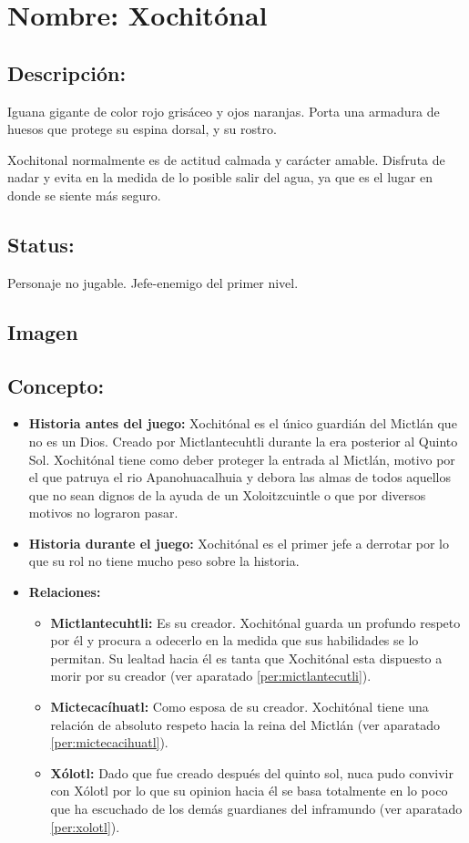 \section{Nombre: Xochitónal}  \label{per:xochitonal}

\subsection{Descripción:}
Iguana gigante de color rojo grisáceo y ojos naranjas. Porta una armadura de huesos que protege su espina dorsal, y su rostro.
\\
\par
Xochitonal normalmente es de actitud calmada y carácter amable. Disfruta de nadar y evita en la medida de lo posible salir del agua, ya que es el lugar en donde se siente más seguro.  
\subsection{Status:}
Personaje no jugable.
Jefe-enemigo del primer nivel.
\subsection{Imagen}
\subsection{Concepto:}
\begin{itemize}
	\item \textbf{Historia antes del juego:}
	Xochitónal es el único guardián del Mictlán que no es un Dios. Creado por Mictlantecuhtli durante la era posterior al Quinto Sol. Xochitónal tiene como deber proteger la entrada al Mictlán, motivo por el que patruya el rio Apanohuacalhuia y debora las almas de todos aquellos que no sean dignos de la ayuda de un Xoloitzcuintle o que por diversos motivos no lograron pasar.
	\item \textbf{Historia durante el juego:}
	Xochitónal es el primer jefe a derrotar por lo que su rol no tiene mucho peso sobre la historia.
	\item \textbf{Relaciones:}
	\begin{itemize}
		\item \textbf{Mictlantecuhtli:} Es su creador. Xochitónal guarda un profundo respeto por él y procura a odecerlo en la medida que sus habilidades se lo permitan. Su lealtad hacia él es tanta que Xochitónal esta dispuesto a morir por su creador (ver aparatado \ref{per:mictlantecutli}). 
		\item \textbf{Mictecacíhuatl:} Como esposa de su creador. Xochitónal tiene una relación de absoluto respeto hacia la reina del Mictlán (ver aparatado \ref{per:mictecacihuatl}). 
		\item \textbf{Xólotl:} Dado que fue creado después del quinto sol, nuca pudo convivir con Xólotl por lo que su opinion hacia él se basa totalmente en lo poco que ha escuchado de los demás guardianes del inframundo (ver aparatado \ref{per:xolotl}).
	\end{itemize}			  
\end{itemize} 
